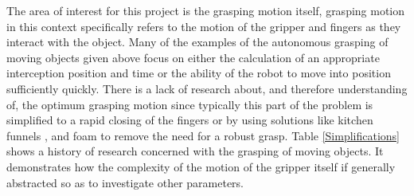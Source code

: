 The area of interest for this project is the grasping motion itself, grasping motion in this context specifically refers to the motion of the gripper and fingers as they interact with the object. Many of the examples of the autonomous grasping of moving objects given above focus on either the calculation of an appropriate interception position and time or the ability of the robot to move into position sufficiently quickly. There is a lack of research about, and therefore understanding of, the optimum grasping motion since typically this part of the problem is simplified to a rapid closing of the fingers \cite{RollinJustin, KinematicallyOptimal} or by using solutions like kitchen funnels \cite{EarlyAnticipation}, and foam \cite{DisneyRobot} to remove the need for a robust grasp. Table \ref{Simplifications} shows a history of research concerned with the grasping of moving objects. It demonstrates how the complexity of the motion of the gripper itself if generally abstracted so as to investigate other parameters.

